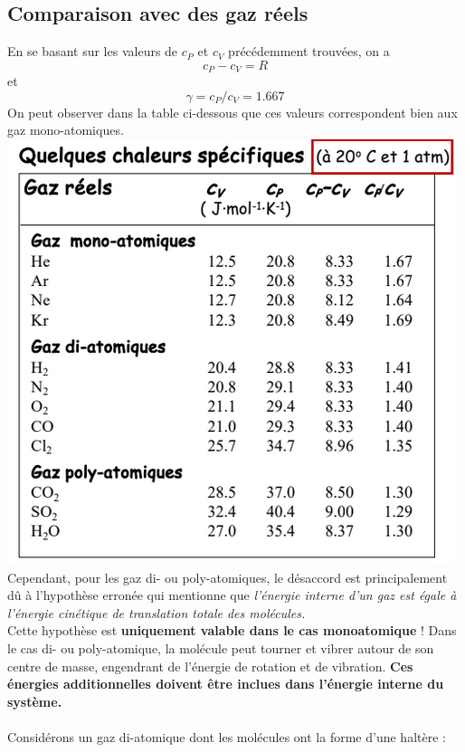 \documentclass{article}
\begin{document}
    \subsection{Comparaison avec des gaz réels}
        En se basant sur les valeurs de $c_P$ et $c_V$ précédemment trouvées, on a 
        $$
        c_P - c_V = R
        $$
        et
        $$
        \gamma = c_P / c_V = 1.667
        $$
        On peut observer dans la table ci-dessous que ces valeurs correspondent bien aux gaz mono-atomiques.\\
        \includegraphics[scale = 0.5]{chaleurs_specifiques.png}\\
        Cependant, pour les gaz di- ou poly-atomiques, le désaccord est principalement dû à l'hypothèse erronée qui mentionne que \textit{l’énergie interne d’un gaz est égale à l’énergie cinétique de translation totale des molécules.}\\
        Cette hypothèse est \textbf{uniquement valable dans le cas monoatomique} ! 
        Dans le cas di- ou poly-atomique, la molécule peut tourner et vibrer autour de son centre de masse, engendrant de l’énergie de rotation et de vibration. 
        \textbf{Ces énergies additionnelles doivent être inclues dans l’énergie interne du système.}\\\\
        Considérons un gaz di-atomique dont les molécules ont la forme d'une haltère :\\
\end{document}
